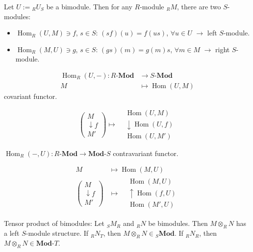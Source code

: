 \documentclass[11pt, a4paper]{report}
\begin{document}
\begin{example}

Let $U := {}_{R}U_{S}$ be a bimodule.
Then for any $R$-module ${}_{R}M$, there are two $S$-modules:
\begin{itemize}
\item $\operatorname{Hom}_{R}(U, M) \ni f$, $s \in S$: $(sf)(u) = f(us)$, $\forall u \in U$ $\to$ left $S$-module.
\item $\operatorname{Hom}_{R}(M, U) \ni g$, $s \in S$: $(gs)(m) = g(m)s$, $\forall m \in M$ $\to$ right $S$-module.
\end{itemize}

\[
\begin{aligned}
\operatorname{Hom}_{R}(U, -): R\text{-}\mathbf{Mod} & \to S\text{-}\mathbf{Mod} \\
M & \mapsto \operatorname{Hom}(U, M)
\end{aligned}
\] covariant functor.

\[
\left(\begin{array}{c}
M \\
\downarrow {\scriptstyle f} \\
M'
\end{array}\right) \longmapsto \begin{aligned}
& \operatorname{Hom}(U, M) \\
& \downarrow {\scriptstyle \operatorname{Hom}(U, f)} \\
& \operatorname{Hom}(U, M')
\end{aligned}
\]

$\operatorname{Hom}_{R}(-, U): R\text{-}\mathbf{Mod} \to \mathbf{Mod}\text{-}S$ contravariant functor.

\[
\begin{aligned}
M & \mapsto \operatorname{Hom}(M, U) \\
\left(\begin{array}{c}
M \\
\downarrow {\scriptstyle f} \\
M'
\end{array}\right) & \mapsto \begin{aligned}
& \operatorname{Hom}(M, U) \\
& \uparrow {\scriptstyle \operatorname{Hom}(f, U)} \\
& \operatorname{Hom}(M', U)
\end{aligned}
\end{aligned}
\]

\end{example}
\begin{proposition}
Tensor product of bimodules: Let ${}_{S}M_{R}$ and ${}_{R}N$ be bimodules. Then $M \otimes_{R} N$ has a left $S$-module structure. If ${}_{R}N_{T}$, then $M \otimes_{R} N \in {}_{S}\textbf{Mod}$. If ${}_{R}N_{R}$, then $M \otimes_{R} N \in \textbf{Mod-}T$.
\end{proposition}
\end{document}
